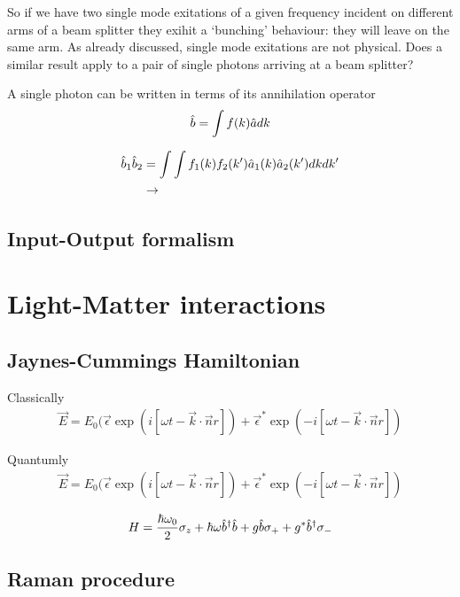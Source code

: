 So if we have two single mode exitations of a given frequency incident on different arms of a beam splitter they exihit a `bunching' behaviour: they will leave on the same arm. As already discussed, single mode exitations are not physical. Does a similar result apply to a pair of single photons arriving at a beam splitter?

A single photon can be written in terms of its annihilation operator
\begin{align}
  \hat{b} = \int f(k) \hat{a} dk
\end{align}

\begin{align}
  \hat{b}_1 \hat{b}_2 & = \int \int f_1(k)f_2(k') \hat{a}_1(k) \hat{a}_2(k') dkdk' \\
                    & \rightarrow
\end{align}

\subsection{Input-Output formalism}



\section{Light-Matter interactions}

\subsection{Jaynes-Cummings Hamiltonian}

Classically
\begin{align}
  \vec{E} = E_0 (\vec{\epsilon}\exp(i[\omega t - \vec{k}\cdot\vec{n}r]) + \vec{\epsilon}^*\exp(-i[\omega t - \vec{k}\cdot\vec{n}r])
\end{align}

Quantumly
\begin{align}
  \vec{E} = E_0 (\vec{\epsilon}\exp(i[\omega t - \vec{k}\cdot\vec{n}r]) + \vec{\epsilon}^*\exp(-i[\omega t - \vec{k}\cdot\vec{n}r])
\end{align}

\begin{align}
  H = \frac{\hbar \omega_0}{2} \mathbf{\sigma}_z + \hbar \omega \hat{b}^\dagger\hat{b} + g\hat{b} \mathbf{\sigma}_{+} + g^{*}\hat{b}^\dagger \mathbf{\sigma}_{-}
\end{align}

\subsection{Raman procedure}


